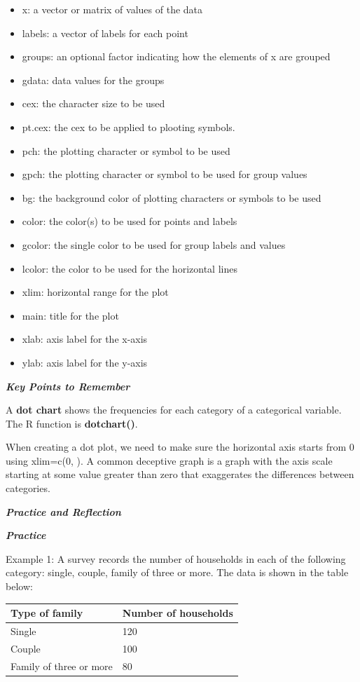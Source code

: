 \begin{itemize}
\item
  x: a vector or matrix of values of the data
\item
  labels: a vector of labels for each point
\item
  groups: an optional factor indicating how the elements of x are
  grouped
\item
  gdata: data values for the groups
\item
  cex: the character size to be used
\item
  pt.cex: the cex to be applied to plooting symbols.
\item
  pch: the plotting character or symbol to be used
\item
  gpch: the plotting character or symbol to be used for group values
\item
  bg: the background color of plotting characters or symbols to be used
\item
  color: the color(s) to be used for points and labels
\item
  gcolor: the single color to be used for group labels and values
\item
  lcolor: the color to be used for the horizontal lines
\item
  xlim: horizontal range for the plot
\item
  main: title for the plot
\item
  xlab: axis label for the x-axis
\item
  ylab: axis label for the y-axis
\end{itemize}

\emph{\textbf{Key Points to Remember}}

A \textbf{dot chart} shows the frequencies for each category of a
categorical variable. The R function is \textbf{dotchart()}.

When creating a dot plot, we need to make sure the horizontal axis
starts from 0 using xlim=c(0, ). A common deceptive graph is a graph
with the axis scale starting at some value greater than zero that
exaggerates the differences between categories.

\emph{\textbf{Practice and Reflection}}

\emph{\textbf{Practice}}

Example 1: A survey records the number of households in each of the
following category: single, couple, family of three or more. The data is
shown in the table below:

\begin{longtable}[]{@{}ll@{}}
\toprule
Type of family & Number of households\tabularnewline
\midrule
\endhead
Single & 120\tabularnewline
Couple & 100\tabularnewline
Family of three or more & 80\tabularnewline
\bottomrule
\end{longtable}

